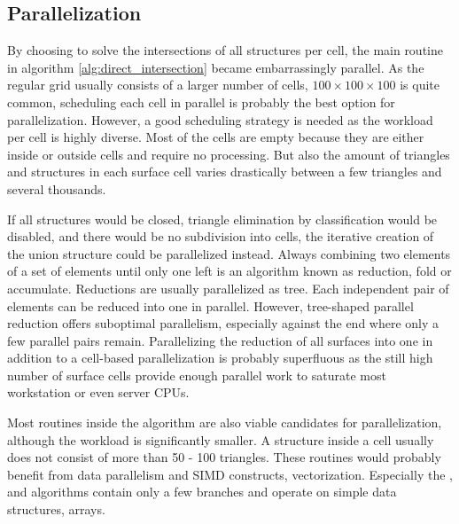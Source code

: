 \subsection{Parallelization}
\label{sec:parallelization}

By choosing to solve the intersections of all structures per cell, the main routine in algorithm \ref{alg:direct_intersection} became embarrassingly parallel.
As the regular grid usually consists of a larger number of cells, \eg $100 \times 100 \times 100$ is quite common, scheduling each cell in parallel is probably the best option for parallelization.
However, a good scheduling strategy is needed as the workload per cell is highly diverse.
Most of the cells are empty because they are either inside or outside cells and require no processing.
But also the amount of triangles and structures in each surface cell varies drastically between a few triangles and several thousands.

If all structures would be closed, \ie triangle elimination by classification would be disabled, and there would be no subdivision into cells, the iterative creation of the union structure could be parallelized instead.
Always combining two elements of a set of elements until only one left is an algorithm known as reduction, fold or accumulate.
Reductions are usually parallelized as tree.
Each independent pair of elements can be reduced into one in parallel.
However, tree-shaped parallel reduction offers suboptimal parallelism, especially against the end where only a few parallel pairs remain.
Parallelizing the reduction of all surfaces into one in addition to a cell-based parallelization is probably superfluous as the still high number of surface cells provide enough parallel work to saturate most workstation or even server CPUs.

Most routines inside the  algorithm are also viable candidates for parallelization, although the workload is significantly smaller.
A structure inside a cell usually does not consist of more than 50 - 100 triangles.
These routines would probably benefit from data parallelism and SIMD constructs, \ie vectorization.
Especially the ,  and  algorithms contain only a few branches and operate on simple data structures, \ie arrays.

